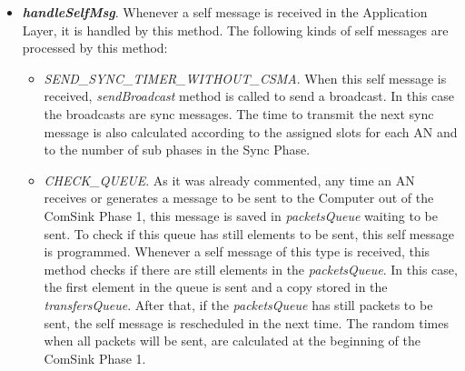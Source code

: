 \begin{itemize}
\begin{itemize}
\begin{itemize}
      \item Report for this \ac{AN}. This report is now deleted, but in future works it could be used by the Computer to communicate with 
      the \acp{AN}.

      \item Report for a \ac{MN}. This report is for a \ac{MN} from which this \ac{AN} is selected \ac{AN}. This packet was probably requested
      from the \ac{MN}. In future works, this packet would be saved and sent to the \ac{MN} when requested. Right now is just deleted.
    \end{itemize}
  \end{itemize}

  \item \textbf{\textit{handleSelfMsg}}. Whenever a self message is received in the Application Layer, it is handled by this method. The 
  following kinds of self messages are processed by this method:
  \begin{itemize}
    \item \textit{SEND\_SYNC\_TIMER\_WITHOUT\_CSMA}. When this self message is received, \textit{sendBroadcast} method is called to send 
    a broadcast. In this case the broadcasts are sync messages. The time to transmit the next sync message is also calculated according 
    to the assigned slots for each \ac{AN} and to the number of sub phases in the Sync Phase.

    \item \textit{CHECK\_QUEUE}. As it was already commented, any time an \ac{AN} receives or generates a message to be sent to the Computer 
    out of the ComSink Phase 1, this message is saved in \textit{packetsQueue} waiting to be sent. To check if this queue has still elements 
    to be sent, this self message is programmed. Whenever a self message of this type is received, this method checks if there are still 
    elements in the \textit{packetsQueue}. In this case, the first element in the queue is sent and a copy stored in the \textit{transfersQueue}.
    After that, if the \textit{packetsQueue} has still packets to be sent, the self message is rescheduled in the next time. The random times 
    when all packets will be sent, are calculated at the beginning of the ComSink Phase 1.


\end{itemize}
\end{itemize}

